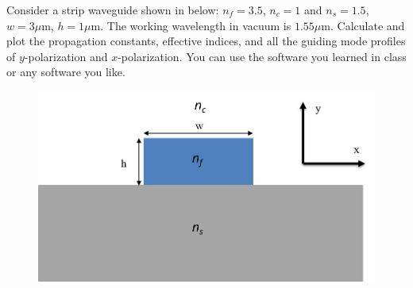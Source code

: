 \documentclass{assignment}
\begin{document}
\begin{prob}
    Consider a strip waveguide shown in below: $n_f=3.5$, $n_c=1$ and $n_s=1.5$, $w=3\mu\mathrm{m}$, $h=1\mu\mathrm{m}$. The working wavelength in vacuum is $1.55\mu\mathrm{m}$. Calculate and plot the propagation constants, effective indices, and all the guiding mode profiles of $y$-polarization and $x$-polarization. You can use the software you learned in class or any software you like.
    \begin{figure}[h]
        \centering
        \includegraphics[width=.5\columnwidth]{A-2.jpg}
    \end{figure}
\end{prob}
\begin{sol}
    
\end{sol}
\end{document}

